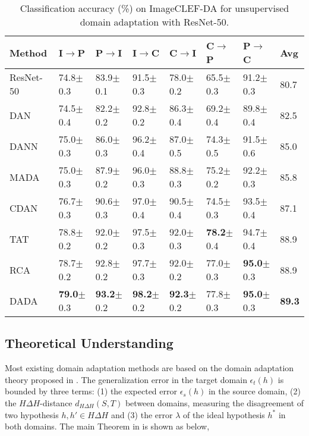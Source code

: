 \documentclass{ecai}
\begin{document}
\begin{table*}[!htbp]
\centering
\caption{Classification accuracy (\%) on ImageCLEF-DA for unsupervised domain adaptation with ResNet-50.}
\begin{tabular}{p{3.0cm}p{1.4cm}<{\centering}p{1.4cm}<{\centering}p{1.4cm}<{\centering}p{1.4cm}<{\centering}p{1.4cm}<{\centering}p{1.4cm}<{\centering}p{1.4cm}<{\centering}}
\toprule
Method&   I$\rightarrow$P&   P$\rightarrow$I&   I$\rightarrow$C&   C$\rightarrow$I&   C$\rightarrow$P&   P$\rightarrow$C&  Avg\\
\midrule
ResNet-50\cite{b36}&  74.8$\pm$0.3&   83.9$\pm$0.1&   91.5$\pm$0.3&   78.0$\pm$0.2&   65.5$\pm$0.3&   91.2$\pm$0.3&   80.7\\
DAN\cite{b9}&  74.5$\pm$0.4&   82.2$\pm$0.2&   92.8$\pm$0.2&   86.3$\pm$0.4&   69.2$\pm$0.4&   89.8$\pm$0.4&   82.5\\
DANN\cite{b18}& 75.0$\pm$0.3&   86.0$\pm$0.3&   96.2$\pm$0.4&   87.0$\pm$0.5&   74.3$\pm$0.5&   91.5$\pm$0.6&   85.0\\
MADA\cite{b13}& 75.0$\pm$0.3&   87.9$\pm$0.2&   96.0$\pm$0.3&   88.8$\pm$0.3&   75.2$\pm$0.2&   92.2$\pm$0.3&   85.8\\
CDAN\cite{b34}& 76.7$\pm$0.3&   90.6$\pm$0.3&   97.0$\pm$0.4&   90.5$\pm$0.4&   74.5$\pm$0.3&   93.5$\pm$0.4&   87.1\\
TAT\cite{b35}&  78.8$\pm$0.2&   92.0$\pm$0.2&   97.5$\pm$0.3&   92.0$\pm$0.3&   \textbf{78.2}$\pm$0.4&   94.7$\pm$0.4&   88.9\\
RCA\cite{b17}&  78.7$\pm$0.2&   92.8$\pm$0.2&   97.7$\pm$0.3&   92.0$\pm$0.2&   77.0$\pm$0.3&   \textbf{95.0}$\pm$0.3&   88.9\\
DADA&      \textbf{79.0}$\pm$0.3& \textbf{93.2}$\pm$0.2& \textbf{98.2}$\pm$0.2&   \textbf{92.3}$\pm$0.2&   77.8$\pm$0.3&   \textbf{95.0}$\pm$0.3&   \textbf{89.3}\\
\bottomrule
\end{tabular}
\label{res_2}
\end{table*}

\subsection{Theoretical Understanding}

Most existing domain adaptation methods are based on the domain adaptation theory proposed in \cite{b3}. The generalization error in the target domain $\epsilon_{t}(h)$ is bounded by three terms: (1) the expected error $\epsilon_s(h)$ in the source domain, (2) the $H\Delta H$-distance $d_{H\Delta H}(S,T)$ between domains, measuring the disagreement of two hypothesis $h,h' \in H \Delta H$ and (3) the error $\lambda$ of the ideal hypothesis $h^*$ in both domains. The main Theorem in \cite{b3} is shown as below,
\end{document}
